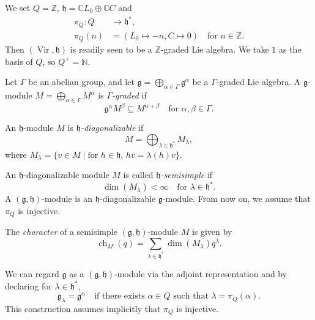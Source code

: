 \documentclass[a4paper, 12pt, reqno]{amsart}
\DeclareMathOperator{\Vir}{Vir}
\DeclareMathOperator{\ch}{ch}
\begin{document}
We set $Q = \mathbb{Z}$, $\mathfrak{h} = \mathbb{C}L_0 \oplus \mathbb{C}C$ and
\begin{align*}
  \pi_Q: Q &\to \mathfrak{h}^*, \\
  \pi_Q(n) &= (L_0 \mapsto -n, C \mapsto 0) \quad \text{for $n \in \mathbb{Z}$}.
\end{align*}
Then $(\Vir, \mathfrak{h})$ is readily seen to be a $\mathbb{Z}$-graded Lie algebra.
We take $1$ as the basis of $Q$, so $Q^+ = \mathbb{N}$.

Let $\Gamma$ be an abelian group, and let $\mathfrak{g} = \bigoplus_{\alpha \in \Gamma}\mathfrak{g}^{\alpha}$ be a $\Gamma$-graded Lie algebra.
A $\mathfrak{g}$-module $M = \bigoplus_{\alpha \in \Gamma}M^{\alpha}$ is \emph{$\Gamma$-graded} if
\begin{equation*}
  \mathfrak{g}^{\alpha}M^{\beta} \subseteq M^{\alpha + \beta} \quad \text{for $\alpha, \beta \in \Gamma$}.
\end{equation*}

An $\mathfrak{h}$-module $M$ is \emph{$\mathfrak{h}$-diagonalizable} if
\begin{equation*}
  M = \bigoplus_{\lambda \in \mathfrak{h}^*}M_{\lambda},
\end{equation*}
where $M_{\lambda} = \{v \in M \mid \text{for $h \in \mathfrak{h}$, $hv = \lambda(h)v$}\}$.

An $\mathfrak{h}$-diagonalizable module $M$ is called \emph{$\mathfrak{h}$-semisimple} if
\begin{equation*}
  \dim(M_{\lambda}) < \infty \quad \text{for $\lambda \in \mathfrak{h}^*$}.
\end{equation*}
A $(\mathfrak{g}, \mathfrak{h})$-module is an $\mathfrak{h}$-diagonalizable $\mathfrak{g}$-module.
From now on, we assume that $\pi_Q$ is injective.

The \emph{character} of a semisimple $(\mathfrak{g}, \mathfrak{h})$-module $M$ is given by
\begin{equation*}
  \ch_M(q) = \sum_{\lambda \in \mathfrak{h}^*}\dim(M_{\lambda})q^{\lambda}.
\end{equation*}

We can regard $\mathfrak{g}$ as a $(\mathfrak{g}, \mathfrak{h})$-module via the adjoint representation and by declaring for $\lambda \in \mathfrak{h}^*$,
\begin{equation*}
  \mathfrak{g}_{\lambda} = \mathfrak{g}^{\alpha} \quad \text{if there exists $\alpha \in Q$ such that $\lambda = \pi_Q(\alpha)$}.
\end{equation*}
This construction assumes implicitly that $\pi_Q$ is injective.
\end{document}
